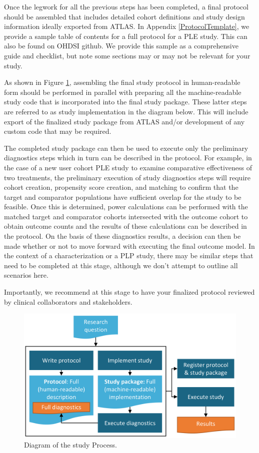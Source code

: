 \documentclass[11pt]{book}
\theoremstyle{definition}
\theoremstyle{definition}
\theoremstyle{definition}
\theoremstyle{remark}
\begin{document}
Once the legwork for all the previous steps has been completed, a final protocol should be assembled that includes detailed cohort definitions and study design information ideally exported from ATLAS. In Appendix \ref{ProtocolTemplate}, we provide a sample table of contents for a full protocol for a PLE study. This can also be found on OHDSI github. We provide this sample as a comprehensive guide and checklist, but note some sections may or may not be relevant for your study.

As shown in Figure \ref{fig:studyProcess}, assembling the final study protocol in human-readable form should be performed in parallel with preparing all the machine-readable study code that is incorporated into the final study package. These latter steps are referred to as study implementation in the diagram below. This will include export of the finalized study package from ATLAS and/or development of any custom code that may be required.

The completed study package can then be used to execute only the preliminary diagnostics steps which in turn can be described in the protocol. For example, in the case of a new user cohort PLE study to examine comparative effectiveness of two treatments, the preliminary execution of study diagnostics steps will require cohort creation, propensity score creation, and matching to confirm that the target and comparator populations have sufficient overlap for the study to be feasible. Once this is determined, power calculations can be performed with the matched target and comparator cohorts intersected with the outcome cohort to obtain outcome counts and the results of these calculations can be described in the protocol. On the basis of these diagnostics results, a decision can then be made whether or not to move forward with executing the final outcome model. In the context of a characterization or a PLP study, there may be similar steps that need to be completed at this stage, although we don't attempt to outline all scenarios here.

Importantly, we recommend at this stage to have your finalized protocol reviewed by clinical collaborators and stakeholders.

\begin{figure}

{\centering \includegraphics[width=0.9\linewidth]{images/StudySteps/studyProcess} 

}

\caption{Diagram of the study Process.}\label{fig:studyProcess}
\end{figure}
\end{document}
